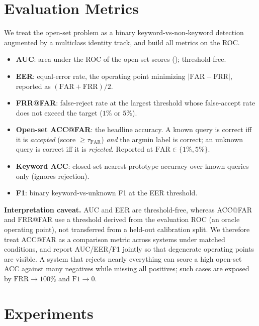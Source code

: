\documentclass[10pt,twocolumn]{article}
\newcommand{\far}{\text{FAR}}
\newcommand{\frr}{\text{FRR}}
\begin{document}
\section{Evaluation Metrics}\label{sec:metrics}

We treat the open-set problem as a binary keyword-vs-non-keyword detection
augmented by a multiclass identity track, and build all metrics on the ROC.

\begin{itemize}[leftmargin=1.2em,itemsep=2pt]
\item \textbf{AUC}: area under the ROC of the open-set scores
(); threshold-free.
\item \textbf{EER}: equal-error rate, the operating point minimizing
$|\far-\frr|$, reported as $(\far+\frr)/2$.
\item \textbf{FRR@FAR}: false-reject rate at the largest threshold whose
false-accept rate does not exceed the target ($1\%$ or $5\%$).
\item \textbf{Open-set ACC@FAR}: the headline accuracy. A known query is correct
iff it is \emph{accepted} (score $\ge\tau_{\far}$) \emph{and} the argmin label is
correct; an unknown query is correct iff it is \emph{rejected}. Reported at
$\far\in\{1\%,5\%\}$.
\item \textbf{Keyword ACC}: closed-set nearest-prototype accuracy over known
queries only (ignores rejection).
\item \textbf{F1}: binary keyword-vs-unknown F1 at the EER threshold.
\end{itemize}

\noindent\textbf{Interpretation caveat.} AUC and EER are threshold-free, whereas
ACC@FAR and FRR@FAR use a threshold derived from the evaluation ROC (an oracle
operating point), not transferred from a held-out calibration split. We
therefore treat ACC@FAR as a comparison metric across systems under matched
conditions, and report AUC/EER/F1 jointly so that degenerate operating points
are visible. A system that rejects nearly everything can score a high open-set
ACC against many negatives while missing all positives; such cases are exposed by
$\frr\to100\%$ and $\text{F1}\to0$.

\section{Experiments}\label{sec:experiments}
\end{document}
